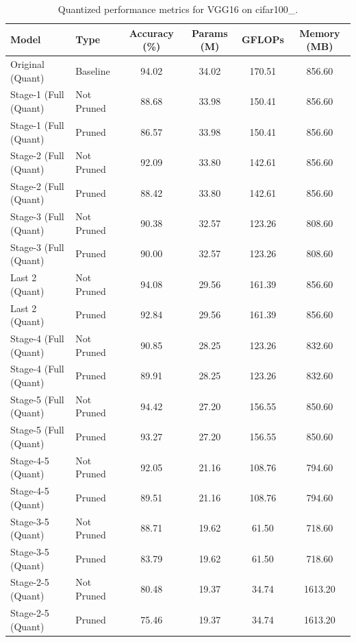 \begin{table}
\caption{Quantized performance metrics for VGG16 on cifar100_.}
\label{tab:VGG16_cifar100__quant}
\begin{tabular}{llcccc}
\toprule
Model & Type & Accuracy (\%) & Params (M) & GFLOPs & Memory (MB) \\
\midrule
Original
(Quant) & Baseline & 94.02 & 34.02 & 170.51 & 856.60 \\
Stage-1 (Full
(Quant) & Not Pruned & 88.68 & 33.98 & 150.41 & 856.60 \\
Stage-1 (Full
(Quant) & Pruned & 86.57 & 33.98 & 150.41 & 856.60 \\
Stage-2 (Full
(Quant) & Not Pruned & 92.09 & 33.80 & 142.61 & 856.60 \\
Stage-2 (Full
(Quant) & Pruned & 88.42 & 33.80 & 142.61 & 856.60 \\
Stage-3 (Full
(Quant) & Not Pruned & 90.38 & 32.57 & 123.26 & 808.60 \\
Stage-3 (Full
(Quant) & Pruned & 90.00 & 32.57 & 123.26 & 808.60 \\
Last 2
(Quant) & Not Pruned & 94.08 & 29.56 & 161.39 & 856.60 \\
Last 2
(Quant) & Pruned & 92.84 & 29.56 & 161.39 & 856.60 \\
Stage-4 (Full
(Quant) & Not Pruned & 90.85 & 28.25 & 123.26 & 832.60 \\
Stage-4 (Full
(Quant) & Pruned & 89.91 & 28.25 & 123.26 & 832.60 \\
Stage-5 (Full
(Quant) & Not Pruned & 94.42 & 27.20 & 156.55 & 850.60 \\
Stage-5 (Full
(Quant) & Pruned & 93.27 & 27.20 & 156.55 & 850.60 \\
Stage-4-5
(Quant) & Not Pruned & 92.05 & 21.16 & 108.76 & 794.60 \\
Stage-4-5
(Quant) & Pruned & 89.51 & 21.16 & 108.76 & 794.60 \\
Stage-3-5
(Quant) & Not Pruned & 88.71 & 19.62 & 61.50 & 718.60 \\
Stage-3-5
(Quant) & Pruned & 83.79 & 19.62 & 61.50 & 718.60 \\
Stage-2-5
(Quant) & Not Pruned & 80.48 & 19.37 & 34.74 & 1613.20 \\
Stage-2-5
(Quant) & Pruned & 75.46 & 19.37 & 34.74 & 1613.20 \\
\bottomrule
\end{tabular}
\end{table}
